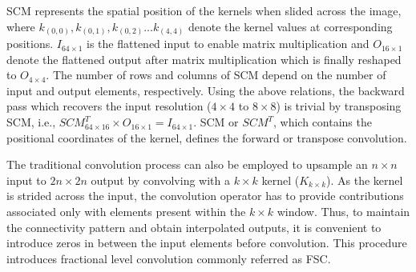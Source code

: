 \documentclass[journal]{IEEEtran}
\begin{document}
SCM represents the spatial position of the kernels when slided across the image, where $k_{(0,0)}, k_{(0,1)}, k_{(0,2)}... k_{(4,4)}$ denote the kernel values at corresponding positions. $I_{64\times1}$ is the flattened input to enable matrix multiplication and $O_{16\times1}$ denote the flattened output after matrix multiplication which is finally reshaped to $O_{4\times4}$. The number of rows and columns of SCM depend on the number of input and output elements, respectively. Using the above relations, the backward pass which recovers the input resolution ($4 \times 4$  to $8 \times 8$) is trivial by transposing SCM, i.e., $SCM_{64 \times 16}^T \times  O_{16\times1} = I_{64\times1}$. SCM or  $SCM^T$,  which contains the positional coordinates of the kernel, defines the forward or transpose convolution.


The traditional convolution process can also be employed to upsample an $n \times n$ input to $2n \times 2n$ output by convolving with a $k \times k$ kernel ($K_{k \times k}$). As the kernel is strided across the input, the convolution operator has to provide contributions associated only with elements present within the $k\times k$ window. Thus, to maintain the connectivity pattern and obtain interpolated outputs, it is convenient to introduce zeros in between the input elements before convolution. This procedure introduces fractional level convolution commonly referred as FSC.
\end{document}
